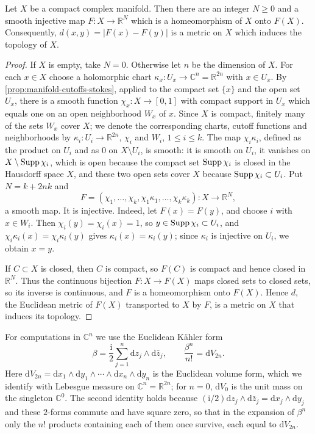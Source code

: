 \begin{lemma}\label{lem:compact-manifold-metric}
Let $X$ be a compact complex manifold. Then there are an integer $N\ge0$ and a smooth injective map $F\colon X\to\mathbb R^N$ which is a homeomorphism of $X$ onto $F(X)$. Consequently, $d(x,y)=|F(x)-F(y)|$ is a metric on $X$ which induces the topology of $X$.
\end{lemma}
\begin{proof}
If $X$ is empty, take $N=0$. Otherwise let $n$ be the dimension of $X$. For each $x\in X$ choose a holomorphic chart $\kappa_x\colon U_x\to\mathbb C^n=\mathbb R^{2n}$ with $x\in U_x$. By \cref{prop:manifold-cutoffs-stokes}, applied to the compact set $\{x\}$ and the open set $U_x$, there is a smooth function $\chi_x\colon X\to[0,1]$ with compact support in $U_x$ which equals one on an open neighborhood $W_x$ of $x$. Since $X$ is compact, finitely many of the sets $W_x$ cover $X$; we denote the corresponding charts, cutoff functions and neighborhoods by $\kappa_i\colon U_i\to\mathbb R^{2n}$, $\chi_i$ and $W_i$, $1\le i\le k$. The map $\chi_i\kappa_i$, defined as the product on $U_i$ and as $0$ on $X\setminus U_i$, is smooth: it is smooth on $U_i$, it vanishes on $X\setminus\operatorname{Supp}\chi_i$, which is open because the compact set $\operatorname{Supp}\chi_i$ is closed in the Hausdorff space $X$, and these two open sets cover $X$ because $\operatorname{Supp}\chi_i\subset U_i$. Put $N=k+2nk$ and
\[
 F=(\chi_1,\ldots,\chi_k,\chi_1\kappa_1,\ldots,\chi_k\kappa_k)\colon X\to\mathbb R^N,
\]
a smooth map. It is injective. Indeed, let $F(x)=F(y)$, and choose $i$ with $x\in W_i$. Then $\chi_i(y)=\chi_i(x)=1$, so $y\in\operatorname{Supp}\chi_i\subset U_i$, and $\chi_i\kappa_i(x)=\chi_i\kappa_i(y)$ gives $\kappa_i(x)=\kappa_i(y)$; since $\kappa_i$ is injective on $U_i$, we obtain $x=y$.

If $C\subset X$ is closed, then $C$ is compact, so $F(C)$ is compact and hence closed in $\mathbb R^N$. Thus the continuous bijection $F\colon X\to F(X)$ maps closed sets to closed sets, so its inverse is continuous, and $F$ is a homeomorphism onto $F(X)$. Hence $d$, the Euclidean metric of $F(X)$ transported to $X$ by $F$, is a metric on $X$ that induces its topology.
\end{proof}

For computations in $\mathbb{C}^n$ we use the Euclidean K\"ahler form
\begin{equation}\label{eq:euclidean-hermitian-form}
 \beta=\frac{\mathrm{i}}2\sum_{j=1}^n\mathrm{d}z_j\wedge\mathrm{d}\bar z_j,
 \qquad \frac{\beta^n}{n!}=\mathrm{d}V_{2n}.
\end{equation}
Here $\mathrm dV_{2n}=\mathrm dx_1\wedge\mathrm dy_1\wedge\cdots\wedge\mathrm dx_n\wedge\mathrm dy_n$ is the Euclidean volume form, which we identify with Lebesgue measure on $\mathbb{C}^n=\mathbb{R}^{2n}$; for $n=0$, $\mathrm dV_0$ is the unit mass on the singleton $\mathbb C^0$. The second identity holds because $(\mathrm{i}/2)\mathrm dz_j\wedge\mathrm d\bar z_j=\mathrm dx_j\wedge\mathrm dy_j$ and these $2$-forms commute and have square zero, so that in the expansion of $\beta^n$ only the $n!$ products containing each of them once survive, each equal to $\mathrm dV_{2n}$.

